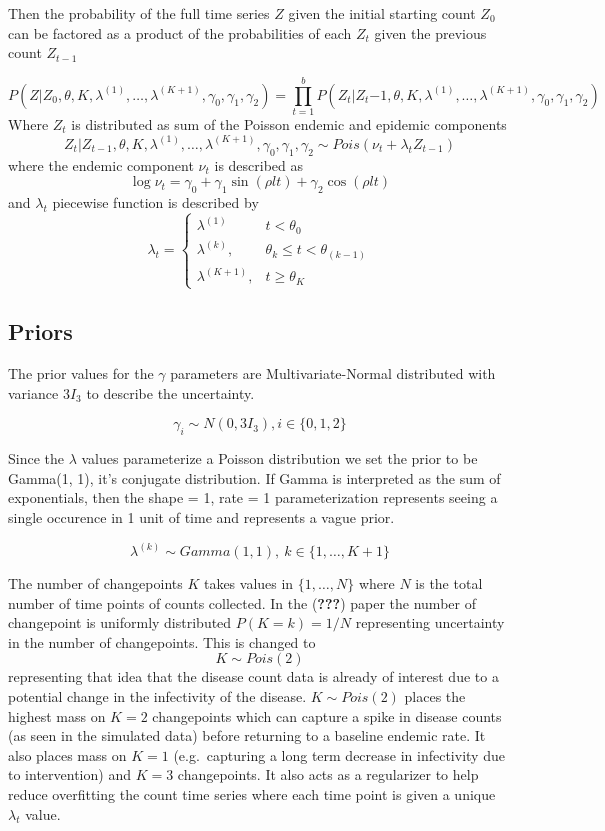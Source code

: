 \documentclass[]{article}
\numberwithin{equation}{section}
\newcommand{\dw}[1]{{\color{red}{#1}}}
\begin{document}
Then the probability of the full time series \(Z\) given the initial
starting count \(Z_0\) can be factored as a product of the probabilities
of each \(Z_t\) given the previous count \(Z_{t-1}\)

\[P(Z|Z_0,\theta, K, \lambda^{(1)}, \dots, \lambda^{(K+1)}, \gamma_0, \gamma_1, \gamma_2 ) = \prod_{t=1}^b P(Z_t|Z_t{-1}, \theta, K, \lambda^{(1)}, \dots, \lambda^{(K+1)}, \gamma_0, \gamma_1, \gamma_2)\]
Where \(Z_t\) is distributed as sum of the Poisson endemic and epidemic
components
\[Z_t|Z_{t-1}, \theta, K, \lambda^{(1)}, \dots, \lambda^{(K+1)}, \gamma_0, \gamma_1, \gamma_2 \sim Pois(\nu_t + \lambda_tZ_{t-1})\]
where the endemic component \(\nu_t\) is described as
\[\log{\nu_t} = \gamma_0 +  \gamma_{1}\sin(\rho l t)+\gamma_{2}\cos(\rho l t)\]
and \(\lambda_t\) piecewise function is described by
\[ \lambda_t =  \begin{cases} \lambda^{(1)} & t < \theta_0 \\
\lambda^{(k)}, & \theta_{k} \leq t < \theta_{(k-1)} \\
\lambda^{(K+1)}, & t \geq \theta_K \end{cases}\]

\hypertarget{priors}{%
\subsection{Priors}\label{priors}}

\dw{move discussion of priors to after you discuss Bayesian Inference}
The prior values for the \(\gamma\) parameters are Multivariate-Normal
distributed with variance \(3I_3\) to describe the uncertainty.

\[\gamma_i \sim N(0, 3I_3), i \in \{0,1,2\}\]

Since the \(\lambda\) values parameterize a Poisson distribution we set
the prior to be Gamma(1, 1), it's conjugate distribution. If Gamma is
interpreted as the sum of exponentials, then the shape = 1, rate = 1
parameterization represents seeing a single occurence in 1 unit of time
and represents a vague prior.

\[ \lambda^{(k)} \sim Gamma(1, 1),\ k \in \{1, \dots, K + 1\} \]

The number of changepoints \(K\) takes values in \(\{1,\dots,N\}\) where
\(N\) is the total number of time points of counts collected. In the
({\textbf{???}}) paper the number of changepoint is uniformly
distributed \(P(K = k) = 1/N\) representing uncertainty in the number of
changepoints. This is changed to \[K \sim Pois(2)\] representing that
idea that the disease count data is already of interest due to a
potential change in the infectivity of the disease. \(K \sim Pois(2)\)
places the highest mass on \(K = 2\) changepoints which can capture a
spike in disease counts (as seen in the simulated data) before returning
to a baseline endemic rate. It also places mass on \(K = 1\)
(e.g.~capturing a long term decrease in infectivity due to intervention)
and \(K = 3\) changepoints. It also acts as a regularizer to help reduce
overfitting the count time series where each time point is given a
unique \(\lambda_t\) value.
\end{document}
